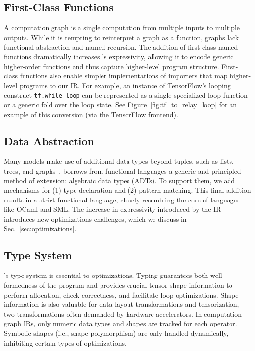 \subsection*{First-Class Functions}

A computation graph is a single computation
  from multiple inputs to multiple outputs.
While it is tempting to reinterpret a graph as a function,
  graphs lack functional abstraction and named recursion.
The addition of first-class named functions dramatically increases
  \relay's expressivity, allowing it to encode generic
  higher-order functions and thus capture higher-level program structure.
First-class functions also enable simpler implementations
  of importers that map higher-level programs to our IR.
For example, an instance of TensorFlow's looping construct \verb|tf.while_loop|
  can be represented as a single specialized loop function
  or a generic fold over the loop state.
See Figure~\ref{fig:tf_to_relay_loop} for an example of this conversion (via
  the \relay TensorFlow frontend).

\subsection*{Data Abstraction}
Many models make use of additional data types beyond
  tuples, such as lists, trees, and graphs~\citep{char-rnn, tree_lstm, graph_lstm}.
\relay borrows from functional languages
  a generic and principled method of extension:
  algebraic data types (ADTs).
To support them, we add mechanisms for
  (1) type declaration and
  (2) pattern matching.
This final addition results in a strict functional language,
  closely resembling the core of languages like OCaml and SML.
The increase in expressivity introduced by the \relay IR introduces
  new optimizations challenges, which we
  discuss in Sec.~\ref{sec:optimizations}.

\subsection{Type System}
\label{subsec:type_system}

\relay's type system is essential
  to optimizations.
Typing guarantees both well-formedness of the program
  and provides crucial tensor shape information to perform allocation,
  check correctness, and facilitate loop optimizations.
Shape information is also valuable for data layout transformations and tensorization,
  two transformations often demanded by hardware accelerators.
In computation graph IRs, only numeric data types
  and shapes are tracked for each operator.
Symbolic shapes (i.e., shape polymorphism) are only handled
  dynamically, inhibiting certain types of optimizations.

